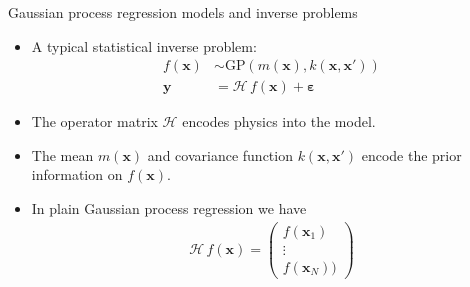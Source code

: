 \documentclass[first=dgreen,second=purple,presentation]{elecslides}
\begin{document}
\begin{frame}{Gaussian process regression models and inverse problems}

 \begin{itemize}[<+->]
 \item A typical \alert{statistical inverse problem}:
\begin{equation}
\begin{split}
  f(\mathbf{x}) &\sim \mathrm{GP}(m(\mathbf{x}),k(\mathbf{x},\mathbf{x}')) \\
  \mathbf{y} &= \boldsymbol{\mathcal{H}} \, f(\mathbf{x}) + \boldsymbol{\varepsilon} %
\end{split}
\nonumber
\end{equation}

\item The \alert{operator matrix} $\boldsymbol{\mathcal{H}}$ encodes \alert{physics} into the model.

\item The \alert{mean} $m(\mathbf{x})$ and \alert{covariance function} $k(\mathbf{x},\mathbf{x}')$ encode the prior information on $f(\mathbf{x})$.

\item In plain \alert{Gaussian process regression} we have
\begin{equation}
\begin{split}
\boldsymbol{\mathcal{H}} \, f(\mathbf{x}) = \begin{pmatrix}
  f(\mathbf{x}_1) \\ \vdots \\ f(\mathbf{x}_N))
  \end{pmatrix}
\end{split}
\nonumber
\end{equation}

 \end{itemize}

\end{frame}
\end{document}
